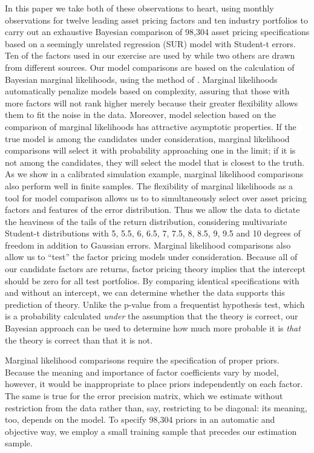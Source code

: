 In this paper we take both of these observations to heart, using monthly observations for twelve leading asset pricing factors and ten industry portfolios to carry out an exhaustive Bayesian comparison of 98,304 asset pricing specifications based on a seemingly unrelated regression (SUR) model with Student-t errors.
Ten of the factors used in our exercise are used by \cite{harvey2015lucky} while two others are drawn from different sources.
Our model comparisons are based on the calculation of Bayesian marginal likelihoods, using the method of \cite{chib1995marginal}.
Marginal likelihoods automatically penalize models based on complexity, assuring that those with more factors will not rank higher merely because their greater flexibility allows them to fit the noise in the data. 
Moreover, model selection based on the comparison of marginal likelihoods has attractive asymptotic properties.
If the true model is among the candidates under consideration, marginal likelihood comparisons will select it with probability approaching one in the limit; if it is not among the candidates, they will select the model that is closest to the truth.
As we show in a calibrated simulation example, marginal likelihood comparisons also perform well in finite samples.
The flexibility of marginal likelihoods as a tool for model comparison allows us to to simultaneously select over asset pricing factors and features of the error distribution.
Thus we allow the data to dictate the heaviness of the tails of the return distribution, considering multivariate Student-t distributions with 5, 5.5, 6, 6.5, 7, 7.5, 8, 8.5, 9, 9.5 and 10 degrees of freedom in addition to Gaussian errors. 
Marginal likelihood comparisons also allow us to ``test'' the factor pricing models under consideration.
Because all of our candidate factors are returns, factor pricing theory implies that the intercept should be zero for all test portfolios. 
By comparing identical specifications with and without an intercept, we can determine whether the data supports this prediction of theory.
Unlike the p-value from a frequentist hypothesis test, which is a probability calculated \emph{under} the assumption that the theory is correct, our Bayesian approach can be used to determine how much more probable it is \emph{that} the theory is correct than that it is not.

Marginal likelihood comparisons require the specification of proper priors.
Because the meaning and importance of factor coefficients vary by model, however, it would be inappropriate to place priors independently on each factor.
The same is true for the error precision matrix, which we estimate without restriction from the data rather than, say, restricting to be diagonal: its meaning, too, depends on the model.
To specify 98,304 priors in an automatic and objective way, we employ a small training sample that precedes our estimation sample.

